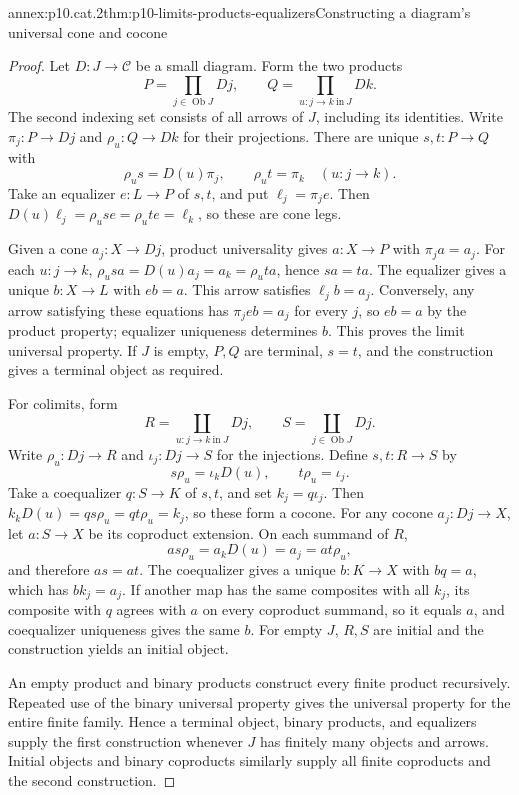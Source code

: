 \begin{annexitem}{annex:p10.cat.2}{thm:p10-limits-products-equalizers}{Constructing a diagram's universal cone and cocone}
\begin{proof}
Let \(D:J\to\mathcal C\) be a small diagram.  Form the two products
\[
 P=\prod_{j\in\operatorname{Ob}J}D j,\qquad
 Q=\prod_{u:j\to k\ \mathrm{in}\ J}D k.
\]
The second indexing set consists of all arrows of \(J\), including
its identities.  Write \(\pi_j:P\to D j\) and
\(\rho_u:Q\to D k\) for their projections.
There are unique \(s,t:P\to Q\) with
\[
                  \rho_u s=D(u)\pi_j,\qquad \rho_u t=\pi_k
                  \quad(u:j\to k).
\]
Take an equalizer \(e:L\to P\) of \(s,t\), and put
\(\ell_j=\pi_j e\).
Then
\(D(u)\ell_j=\rho_u s e=\rho_u t e=\ell_k\), so these are cone
legs.

Given a cone \(a_j:X\to D j\), product universality gives
\(a:X\to P\) with \(\pi_j a=a_j\).
For each \(u:j\to k\),
\(\rho_u s a=D(u)a_j=a_k=\rho_u t a\), hence \(s a=t a\).
The equalizer gives a unique \(b:X\to L\) with \(e b=a\).
This arrow satisfies \(\ell_j b=a_j\).
Conversely, any arrow satisfying these equations has
\(\pi_j e b=a_j\) for every \(j\), so \(e b=a\) by the product
property; equalizer uniqueness determines \(b\).
This proves the limit universal property.
If \(J\) is empty, \(P,Q\) are terminal, \(s=t\), and the
construction gives a terminal object as required.

For colimits, form
\[
 R=\coprod_{u:j\to k\ \mathrm{in}\ J}D j,\qquad
 S=\coprod_{j\in\operatorname{Ob}J}D j.
\]
Write \(\rho_u:D j\to R\) and \(\iota_j:D j\to S\) for
the injections.  Define \(s,t:R\to S\) by
\[
                       s\rho_u=\iota_k D(u),\qquad
                       t\rho_u=\iota_j.
\]
Take a coequalizer \(q:S\to K\) of \(s,t\), and set \(k_j=q\iota_j\).
Then \(k_k D(u)=q s\rho_u=q t\rho_u=k_j\), so these form a
cocone.
For any cocone \(a_j:D j\to X\), let \(a:S\to X\) be its
coproduct extension.  On each summand of \(R\),
\[
               a s\rho_u=a_k D(u)=a_j=a t\rho_u,
\]
and therefore \(a s=a t\).
The coequalizer gives a unique \(b:K\to X\) with \(b q=a\),
which has \(b k_j=a_j\).
If another map has the same composites with all \(k_j\), its
composite with \(q\) agrees with \(a\) on every coproduct summand,
so it equals \(a\), and coequalizer uniqueness gives the same \(b\).
For empty \(J\), \(R,S\) are initial and the construction yields
an initial object.

An empty product and binary products construct every finite
product recursively.  Repeated use of the binary universal
property gives the universal property for the entire finite
family.  Hence a terminal object, binary products, and
equalizers supply the first construction whenever \(J\) has
finitely many objects and arrows.  Initial objects and binary
coproducts similarly supply all finite coproducts and the
second construction.


\end{proof}
\end{annexitem}
